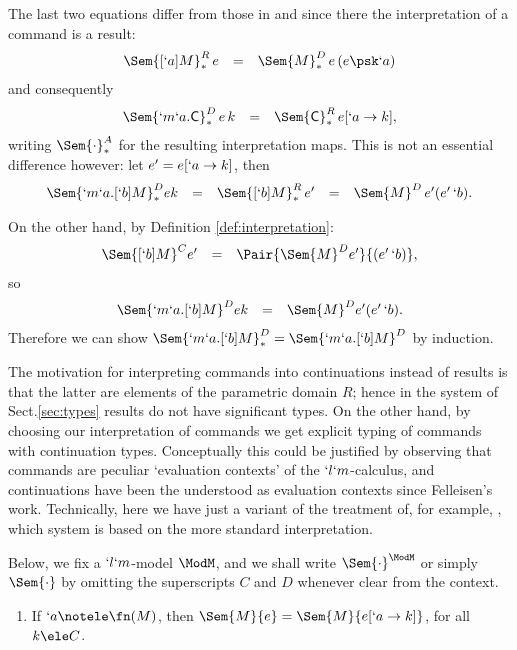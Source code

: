 \documentclass{lmcs}
\begin{document}
The last two equations differ from those in \cite{Bierman'98} and \cite{Streicher-Reus'98} since there the interpretation of a command is a result:
 \[ \begin{array}{rcl}
\Sem{ [`a]M}_*^R \, e &=& \Sem{ M }_*^D \, e \, (e \psk `a) 
 \end{array} \]
and consequently 
 \[ \begin{array}{rcl}
\Sem{ `m`a.\Cmd}_*^D \, e \, k &=& \Sem{ \Cmd}_*^R \, e[`a \to k],
 \end{array} \]
writing $\Sem{ \cdot}_*^A$ for the resulting interpretation maps. This is not an essential difference however:
let $e' = e[`a \to {k}]$, then
 \[ \begin{array}{rcccl}
\Sem{ `m`a.[`b]M}_*^{D }{e}{k} &=& \Sem{ [`b]M}_*^{R}\, e' &=& \Sem{ M}^{D } \, e' (e'\, `b).
 \end{array} \]

On the other hand, by Definition \ref{def:interpretation}:
 \[ \begin{array}{rcl}
\Sem{ [`b]M}^{C}{e}'&=& \Pair{\Sem{ M}^{D}{e'}}{(e' \, `b) }, 
 \end{array} \]
so
 \[ \begin{array}{rcl}
\Sem{ `m`a.[`b]M}^{D }{e}{k} &=& \Sem{ M}^{D }{e'}{(e'\, `b)}.
 \end{array} \]
Therefore we can show $\Sem{ `m`a.[`b]M}_*^{D } = \Sem{ `m`a.[`b]M}^{D }$ by induction.

The motivation for interpreting commands into continuations instead of results is that the latter are elements of the parametric domain $R$; hence
in the system of Sect.\skp\ref{sec:types} results do not have significant types. On the other hand, by choosing our interpretation of commands we get explicit typing of commands with continuation types. 
Conceptually this could be justified by observing that commands are peculiar `evaluation contexts' of the $`l`m$-calculus, and continuations have been the understood as evaluation contexts since Felleisen's work.
Technically, here we have just a variant of the treatment of, for example, \cite{deLiguoro:ApproxLM12}, which system is based on the more standard interpretation.
 
Below, we fix a $`l`m$-model $\ModM$, and we shall write $\Sem{ \cdot}^{\ModM}$ or simply $\Sem{ \cdot}$ by
omitting the superscripts $C$ and $D$ whenever clear from the context.

 \begin{lem} \label{lem:beta-weak} \label{lem:eta-sem}

 \begin{enumerate}

 \firstitem \label{lem:eta-sem i}
If $x \notele \fv(M)$, then $\Sem{ M }{ e } = \Sem{ M }{ e[x \to d] } $, for all $d \ele D$.

 \item \label{lem:eta-sem ii}
If $`a \notele \fn(M)$, then $\Sem{ M }{ e } = \Sem{ M }{ e[`a \to k] } $, for all $k \ele C$.

 \end{enumerate}
 \end{lem}
\end{document}
